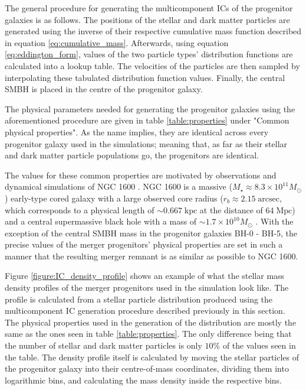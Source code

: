 \documentclass[english, oneside]{HYgradu}
\begin{document}
The general procedure for generating the multicomponent ICs of the progenitor galaxies is as follows. The positions of the stellar and dark matter particles are generated using the inverse of their respective cumulative mass function described in equation \ref{eq:cumulative_mass}. Afterwards, using equation \ref{eq:eddington_form}, values of the two particle types' distribution functions are calculated into a lookup table. The velocities of the particles are then sampled by interpolating these tabulated distribution function values. Finally, the central SMBH is placed in the centre of the progenitor galaxy.

The physical parameters needed for generating the progenitor galaxies using the aforementioned procedure are given in table \ref{table:properties} under "Common physical properties". As the name implies, they are identical across every progenitor galaxy used in the simulations; meaning that, as far as their stellar and dark matter particle populations go, the progenitors are identical. 

The values for these common properties are motivated by observations and dynamical simulations of NGC 1600 \citep{Rantala2018}. NGC 1600 is a massive ($M_\star \approx 8.3 \times 10^{11} M_\odot$) early-type cored galaxy with a large observed core radius ($r_b \approx 2.15 \; \mathrm{arcsec}$, which corresponds to a physical length of $\sim 0.667 \; \mathrm{kpc}$ at the distance of $64 \; \mathrm{Mpc}$) and a central supermassive black hole with a mass of $\sim 1.7 \times 10^{10} M_\odot$ \citep{Thomas2016}. With the exception of the central SMBH mass in the progenitor galaxies BH-0 - BH-5, the precise values of the merger progenitors' physical properties are set in such a manner that the resulting merger remnant is as similar as possible to NGC 1600.

Figure \ref{figure:IC_density_profile} shows an example of what the stellar mass density profiles of the merger progenitors used in the simulation look like. The profile is calculated from a stellar particle distribution produced using the multicomponent IC generation procedure described previously in this section. The physical properties used in the generation of the distribution are mostly the same as the ones seen in table \ref{table:properties}. The only difference being that the number of stellar and dark matter particles is only $10 \%$  of the values seen in the table. The density profile itself is calculated by moving the stellar particles of the progenitor galaxy into their centre-of-mass coordinates, dividing them into logarithmic bins, and calculating the mass density inside the respective bins.
\end{document}

